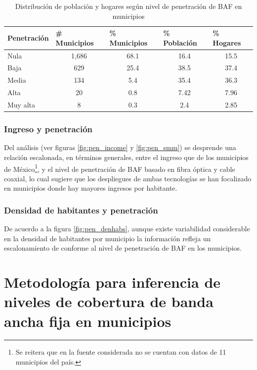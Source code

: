 \documentclass[9pt,twocolumn,twoside]{ilcss}
\begin{document}
\begin{table}[tbhp]
\centering
\caption{Distribución de población y hogares según nivel de penetración de BAF en municipios}
\label{tab:dist_pob_hogs}
\begin{tabular}{@{}lcccc@{}}
	\toprule
	Penetración & \multicolumn{1}{l}{\# Municipios} & \multicolumn{1}{l}{\% Municipios} & \multicolumn{1}{l}{\% Población} & \multicolumn{1}{l}{\% Hogares} \\ \midrule
	Nula & 1,686 & 68.1 & 16.4 & 15.5 \\
	Baja & 629 & 25.4 & 38.5 & 37.4 \\
	Media & 134 & 5.4 & 35.4 & 36.3 \\
	Alta & 20 & 0.8 & 7.42 & 7.96 \\
	Muy alta & 8 & 0.3 & 2.4 & 2.85 \\ \bottomrule
\end{tabular}
\end{table}


\subsubsection{Ingreso y penetración}
Del análisis (ver figuras \ref{fig:pen_income} y \ref{fig:pen_smm}) se desprende una relación escalonada, en términos generales, entre el ingreso que de los municipios de México\footnote{Se reitera que en la fuente considerada no se cuentan con datos de 11 municipios del país.}, y el nivel de penetración de BAF basado en fibra óptica y cable coaxial, lo cual sugiere que los despliegues de ambas tecnologías se han focalizado en municipios donde hay mayores ingresos por habitante.



\subsubsection{Densidad de habitantes y penetración}

De acuerdo a la figura \ref{fig:pen_denhabs}, aunque existe variabilidad considerable en la densidad de habitantes por municipio la información refleja un escalonamiento de conforme al nivel de penetración de BAF en los municipios.

\section{Metodología para inferencia de niveles de cobertura de banda ancha fija en municipios}
\end{document}
